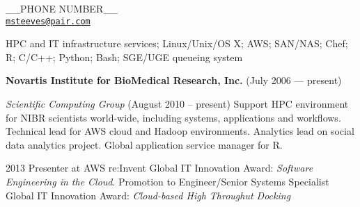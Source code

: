 \documentclass[11pt,article,oneside]{memoir}
\makeatletter
\def\myemail{msteeves@pair.com}
\def\myphone{\_\_PHONE NUMBER\_\_}
\makeatother
\begin{document}
\begin{minipage}[t]{2.95in}
  
\end{minipage}
\hfill
\hfill
\begin{minipage}[t]{1.3in}
  \flushright \footnotesize \addressblock \myphone \\
  {\scriptsize \texttt{\href{mailto:\myemail}{\myemail}}}
\end{minipage}

\medskip

\reversemarginpar

\bigskip


\noindent HPC and IT infrastructure services; Linux/Unix/OS X; AWS;
SAN/NAS; Chef; R; C/C++; Python; Bash; SGE/UGE queueing system

\bigskip

{}

\ind \textbf{Novartis Institute for BioMedical Research, Inc.} (July 2006 --- present)

\noindent\textit{Scientific Computing Group} (August 2010 -- present)
Support HPC environment for NIBR scientists world-wide, including
systems, applications and workflows. Technical lead for AWS cloud and
Hadoop environments. Analytics lead on social data analytics
project. Global application service manager for R.

\ind \hspace{0.35in} \footnotesize 2013 Presenter at AWS
re:Invent Global IT Innovation Award:
\textit{Software Engineering in the Cloud}. Promotion to
Engineer/Senior Systems Specialist Global IT
Innovation Award: \textit{Cloud-based High Throughut Docking}
\normalsize \vspace{0.05in}
\end{document}
